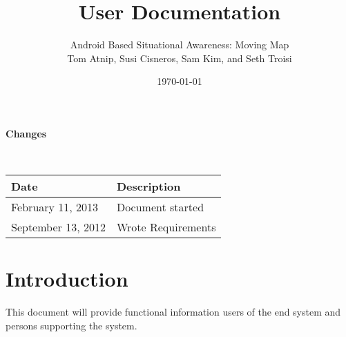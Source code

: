 \documentclass{article}
\begin{document}
\setlength{\voffset}{3.5in}
\title{User Documentation}
\author{\Large Android Based Situational Awareness: Moving Map\\
Tom Atnip, Susi Cisneros, Sam Kim, and Seth Troisi}
\date{\today}
\maketitle
\clearpage
\setlength{\voffset}{0pt}
\tableofcontents
\clearpage


\begin{Large}
\textbf{Changes}
\end{Large}
\\

\begin{tabular}{ | p{1.5in} | p{4.5in} | }
\hline
\textbf{Date} & \textbf{Description}\\
\hline
\hline
February 11, 2013 & Document started\\
\hline
September 13, 2012 & Wrote Requirements\\
\hline
\end{tabular}
\clearpage

\section{Introduction}
This document will provide functional information users of the end system and persons supporting the system.
\end{document}
